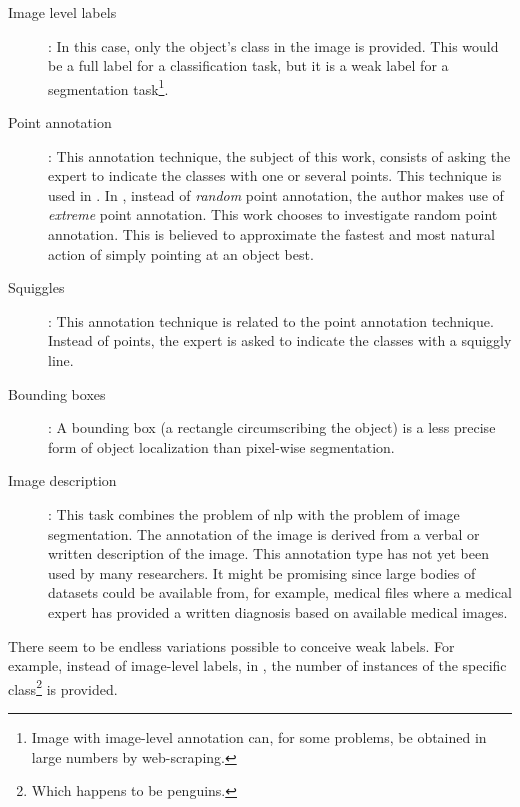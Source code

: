\begin{description}
    \item[Image level labels]: In this case, only the object's class in the image is provided. 
    This would be a full label for a classification task, but it is a weak label for a segmentation task\footnote{Image with image-level annotation can, for some problems, be obtained in large numbers by web-scraping\cite{Shen}.}.
    \item[Point annotation]: This annotation technique, the subject of this work, consists of asking the expert to indicate the classes with one or several points. This technique is used in \cite{Laradji2020, Laradji2018, McEver2020}.
    In \cite{Maninis2018}, instead of \textit{random} point annotation, the author makes use of \textit{extreme} point annotation. This work chooses to investigate random point annotation.
    This is believed to approximate the fastest and most natural action of simply pointing at an object best.
    \item[Squiggles]: This annotation technique is related to the point annotation technique. Instead of points, the expert is asked to indicate the classes with a squiggly line.
    \item[Bounding boxes]: A bounding box (a rectangle circumscribing the object) is a less precise form of object localization than pixel-wise segmentation.
    \item[Image description]: This task combines the problem of \acrlong{nlp} with the problem of image segmentation. The annotation of the image is derived from a verbal or written description of the image. 
    This annotation type has not yet been used by many researchers. 
    It might be promising since large bodies of datasets could be available from, for example, medical files where a medical expert has provided a written diagnosis based on available medical images. 
\end{description}
\par{
    There seem to be endless variations possible to conceive weak labels. 
    For example, instead of image-level labels, in \cite{Laradji2018}, the number of instances of the specific class\footnote{Which happens to be penguins.} is provided. 
}
